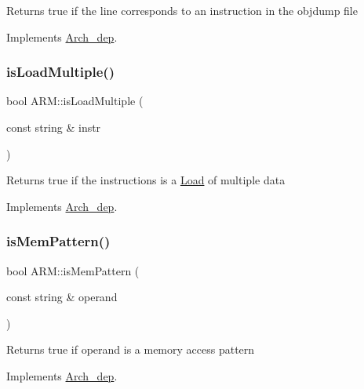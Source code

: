 Returns true if the line corresponds to an instruction in the objdump file 

Implements \hyperlink{classArch__dep_ac537200db0a4cdd0eb3321b65111ccd5}{Arch\+\_\+dep}.

\mbox{\label{classARM_a426d805ed2f8ff041c2904b08f4f8953}} 
\subsubsection{\texorpdfstring{is\+Load\+Multiple()}{isLoadMultiple()}}
{\footnotesize\ttfamily bool A\+R\+M\+::is\+Load\+Multiple (\begin{DoxyParamCaption}\item[{const string \&}]{instr }\end{DoxyParamCaption})\hspace{0.3cm}{\ttfamily [virtual]}}

Returns true if the instructions is a \hyperlink{classLoad}{Load} of multiple data 

Implements \hyperlink{classArch__dep_a1d8126e04db14a502e3b26be2f032552}{Arch\+\_\+dep}.

\mbox{\label{classARM_a0e3c93edce9d2f24aa69eac3accac2bb}} 
\subsubsection{\texorpdfstring{is\+Mem\+Pattern()}{isMemPattern()}}
{\footnotesize\ttfamily bool A\+R\+M\+::is\+Mem\+Pattern (\begin{DoxyParamCaption}\item[{const string \&}]{operand }\end{DoxyParamCaption})\hspace{0.3cm}{\ttfamily [virtual]}}

Returns true if operand is a memory access pattern 

Implements \hyperlink{classArch__dep_aa965a7ac1af14109f60aa2ceab99b6d6}{Arch\+\_\+dep}.

\mbox{\label{classARM_a3ead2b53ee35931a70471d265c5cc449}} 
